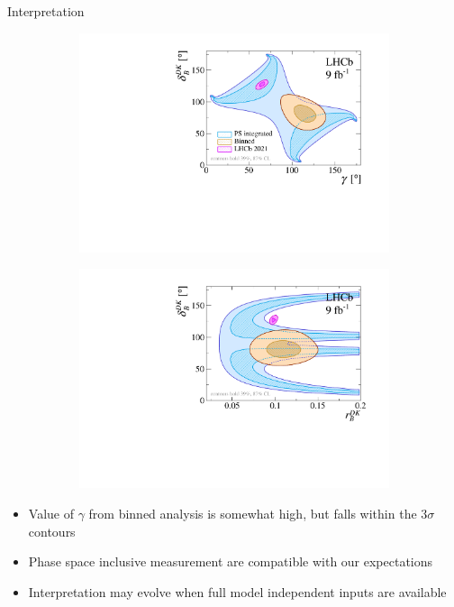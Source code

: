 \documentclass{beamer}
\begin{document}
\begin{frame}{Interpretation}
  \begin{figure}
    \centering
    \begin{subfigure}{0.50\textwidth}
      \includegraphics[width = 1.0\textwidth]{Plots/gammacharm_lhcb_KKpipi_GLW_KKpipi_GGSZ_lhcb_2020_beauty_and_charm_g_d_dk.pdf}
    \end{subfigure}%
    \begin{subfigure}{0.50\textwidth}
      \includegraphics[width = 1.0\textwidth]{Plots/gammacharm_lhcb_KKpipi_GLW_KKpipi_GGSZ_lhcb_2020_beauty_and_charm_r_dk_d_dk.pdf}
    \end{subfigure}
  \end{figure}
  \vspace{-0.35cm}
  \begin{itemize}
    \item{Value of $\gamma$ from binned analysis is somewhat high, but falls within the $3\sigma$ contours}
    \item{Phase space inclusive measurement are compatible with our expectations}
    \item{Interpretation may evolve when full model independent inputs are available}
  \end{itemize}
\end{frame}
\end{document}
